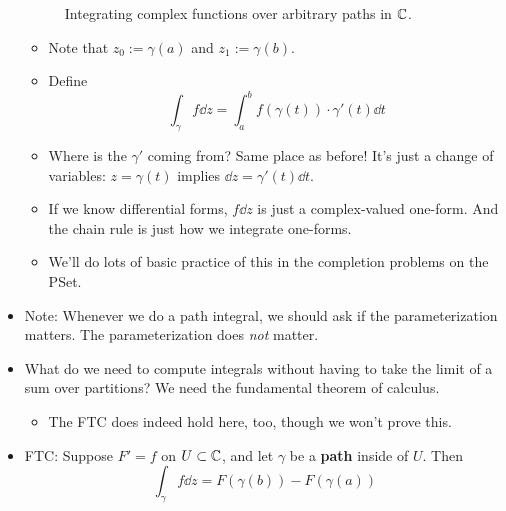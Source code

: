\documentclass[../notes.tex]{subfiles}
\begin{document}
\begin{itemize}
\begin{figure}[H]
        \caption{Integrating complex functions over arbitrary paths in $\mathbb{C}$.}
        \label{fig:intGamma}
    \end{figure}
    \begin{itemize}
        \item Note that $z_0:=\gamma(a)$ and $z_1:=\gamma(b)$.
        \item Define
        \begin{equation*}
            \int_\gamma f\dd{z} = \int_a^bf(\gamma(t))\cdot\gamma'(t)\dd{t}
        \end{equation*}
        \item Where is the $\gamma'$ coming from? Same place as before! It's just a change of variables: $z=\gamma(t)$ implies $\dd{z}=\gamma'(t)\dd{t}$.
        \item If we know differential forms, $f\dd{z}$ is just a complex-valued one-form. And the chain rule is just how we integrate one-forms.
        \item We'll do lots of basic practice of this in the completion problems on the PSet.
    \end{itemize}
    \item Note: Whenever we do a path integral, we should ask if the parameterization matters. The parameterization does \emph{not} matter.
    \item What do we need to compute integrals without having to take the limit of a sum over partitions? We need the fundamental theorem of calculus.
    \begin{itemize}
        \item The FTC does indeed hold here, too, though we won't prove this.
    \end{itemize}
    \item FTC: Suppose $F'=f$ on $U\subset\mathbb{C}$, and let $\gamma$ be a \textbf{path} inside of $U$. Then
    \begin{equation*}
        \int_\gamma f\dd{z} = F(\gamma(b))-F(\gamma(a))
    \end{equation*}

\end{itemize}
\end{document}
